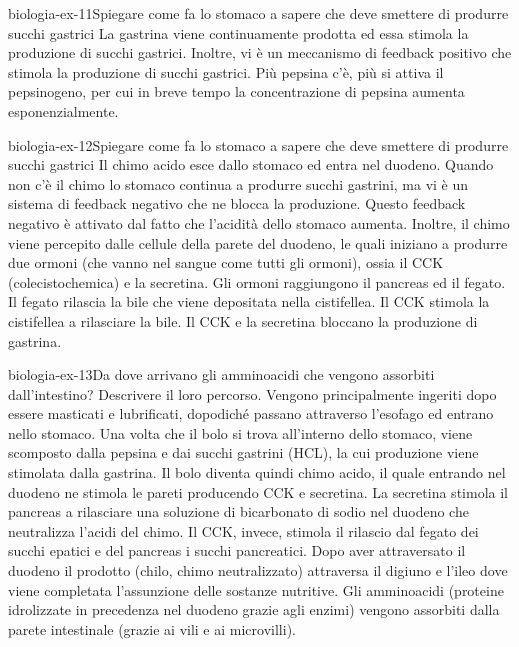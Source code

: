 \documentclass[preview]{standalone}
\begin{document}
\begin{snippetexercise}{biologia-ex-11}{Spiegare come fa lo stomaco a sapere che deve smettere di produrre succhi gastrici}
    La gastrina viene continuamente prodotta ed essa stimola la produzione di succhi gastrici.
    Inoltre, vi è un meccanismo di feedback positivo che stimola la produzione di succhi gastrici.
    Più pepsina c'è, più si attiva il pepsinogeno, per cui in breve tempo la concentrazione di pepsina aumenta esponenzialmente.
\end{snippetexercise}

\begin{snippetexercise}{biologia-ex-12}{Spiegare come fa lo stomaco a sapere che deve smettere di produrre succhi gastrici}
    Il chimo acido esce dallo stomaco ed entra nel duodeno.
    Quando non c'è il chimo lo stomaco continua a produrre succhi gastrini,
    ma vi è un sistema di feedback negativo che ne blocca la produzione.
    Questo feedback negativo è attivato dal fatto che l'acidità dello stomaco aumenta.
    Inoltre, il chimo viene percepito dalle cellule della parete del duodeno, le quali iniziano a produrre
    due ormoni (che vanno nel sangue come tutti gli ormoni), ossia il CCK (colecistochemica) e la secretina.
    Gli ormoni raggiungono il pancreas ed il fegato.
    Il fegato rilascia la bile che viene depositata nella cistifellea.
    Il CCK stimola la cistifellea a rilasciare la bile.
    Il CCK e la secretina bloccano la produzione di gastrina.
\end{snippetexercise}


\begin{snippetexercise}{biologia-ex-13}{Da dove arrivano gli amminoacidi che vengono
    assorbiti dall'intestino? Descrivere il loro percorso.}
    Vengono principalmente ingeriti dopo essere masticati e lubrificati, dopodiché passano attraverso
    l'esofago ed entrano nello stomaco. Una volta che il bolo si trova all'interno dello stomaco,
    viene scomposto dalla pepsina e dai succhi gastrini (HCL), la cui produzione viene stimolata dalla gastrina.
    Il bolo diventa quindi chimo acido, il quale entrando nel duodeno ne stimola le pareti producendo
    CCK e secretina. La secretina stimola il pancreas a rilasciare una soluzione di bicarbonato di sodio
    nel duodeno che neutralizza l'acidi del chimo.
    Il CCK, invece, stimola il rilascio dal fegato dei succhi epatici e del pancreas i succhi pancreatici.
    Dopo aver attraversato il duodeno il prodotto (chilo, chimo neutralizzato) attraversa il digiuno e l'ileo dove
    viene completata l'assunzione delle sostanze nutritive.
    Gli amminoacidi (proteine idrolizzate in precedenza nel duodeno grazie agli enzimi) vengono assorbiti dalla parete intestinale (grazie ai vili e ai microvilli).
\end{snippetexercise}
\end{document}
